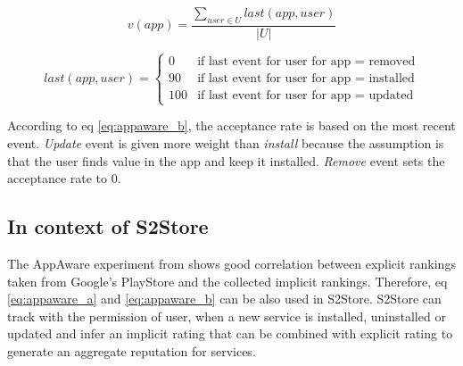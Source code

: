 \begin{equation}\label{eq:appaware_a}
  v(app)=\frac{\sum_{user \in U} last(app, user)}{|U|}
\end{equation}

\begin{equation}\label{eq:appaware_b}
  last(app,user) = \begin{cases}
    0 & \text{if last event for user for app = removed} \\
    90 & \text{if last event for user for app = installed} \\
    100 & \text{if last event for user for app = updated}
  \end{cases}
\end{equation}

According to eq \ref{eq:appaware_b}, the acceptance rate is based on the most recent event. \emph{Update} event is given more weight than \emph{install} because the assumption is that the user finds value in the app and keep it installed. \emph{Remove} event sets the acceptance rate to 0.

\subsection*{In context of S2Store}

The AppAware experiment from \cite{girardello2010explicit} shows good correlation between explicit rankings taken from Google's PlayStore and the collected implicit rankings. Therefore, eq \ref{eq:appaware_a} and \ref{eq:appaware_b} can be also used in S2Store. S2Store can track with the permission of user, when a new service is installed, uninstalled or updated and infer an implicit rating that can be combined with explicit rating to generate an aggregate reputation for services.